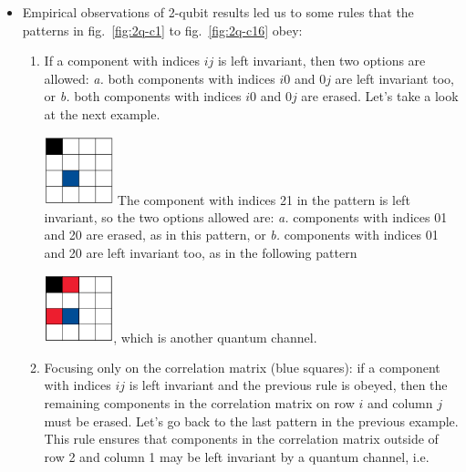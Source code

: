 \documentclass[11pt,dvipsnames]{article} %
\newcommand{\fref}[1]{fig.~\ref{#1}}  \newcommand{\tref}[1]{table~\ref{#1}}
\newcommand{\h}[1]{\colorbox{Yellow}{#1}}
\begin{document}
\begin{itemize}
\item Empirical observations of 2-qubit results led us to some rules that the
patterns in \fref{fig:2q-c1} to \fref{fig:2q-c16} obey:
\begin{enumerate}
\item If a component with indices $ij$ is left invariant, then two options are
allowed: \textit{a.} both components with indices $i0$ and $0j$ are left
invariant too, or \textit{b.} both components with indices $i0$ and $0j$ are
erased.
\janote{\h{Inicio}}
Let's take a look at the next example. \newline

\hfill
\includegraphics[width=2cm]{img/ex-2q2c-empiricalRule}
\hfill \hfill
\newline
The component with indices 21 in the pattern is left invariant,
so the two options allowed are: \textit{a.} components with indices 01 and
20 are erased, as in this pattern, or \textit{b.} components 
with indices 01 and 20 are left invariant too, 
as in the following pattern \newline

\hfill
\includegraphics[width=2cm]{img/ex-2q4c-empiricalRule},
\hfill \hfill 
\newline
which is another quantum channel.

\item Focusing only on the correlation matrix (blue squares): if a component
with indices $ij$ is left invariant and the previous rule is obeyed, then the
remaining components in the correlation matrix on row $i$ and column $j$ must
be erased. 
Let's go back to the last pattern in the previous example. This rule 
ensures that components in the correlation matrix outside of row 2 and 
column 1 may be left invariant by a quantum channel, i.e.\newline


\end{enumerate}
\end{itemize}
\end{document}
